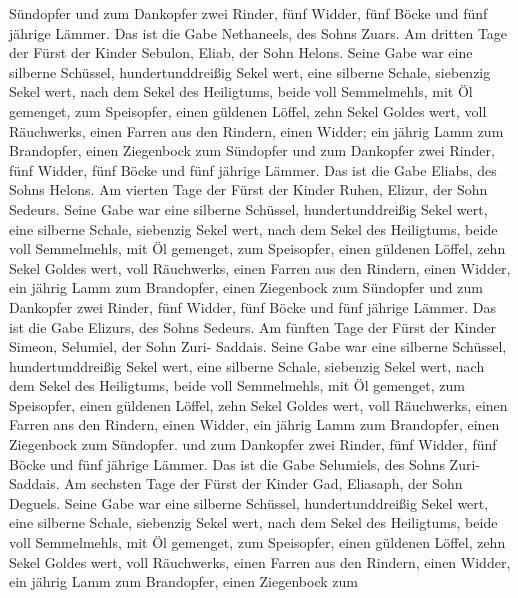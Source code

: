 Sündopfer  und zum Dankopfer zwei Rinder, fünf Widder, fünf
Böcke und fünf jährige Lämmer. Das ist die Gabe Nethaneels, des Sohns
Zuars.  Am dritten Tage der Fürst der Kinder Sebulon,
Eliab, der Sohn Helons.  Seine Gabe war eine silberne
Schüssel, hundertunddreißig Sekel wert, eine silberne Schale, siebenzig
Sekel wert, nach dem Sekel des Heiligtums, beide voll Semmelmehls, mit
Öl gemenget, zum Speisopfer,  einen güldenen Löffel, zehn
Sekel Goldes wert, voll Räuchwerks,  einen Farren aus den
Rindern, einen Widder; ein jährig Lamm zum Brandopfer, 
einen Ziegenbock zum Sündopfer  und zum Dankopfer zwei
Rinder, fünf Widder, fünf Böcke und fünf jährige Lämmer. Das ist die
Gabe Eliabs, des Sohns Helons.  Am vierten Tage der Fürst
der Kinder Ruhen, Elizur, der Sohn Sedeurs.  Seine Gabe war
eine silberne Schüssel, hundertunddreißig Sekel wert, eine silberne
Schale, siebenzig Sekel wert, nach dem Sekel des Heiligtums, beide voll
Semmelmehls, mit Öl gemenget, zum Speisopfer,  einen
güldenen Löffel, zehn Sekel Goldes wert, voll Räuchwerks, 
einen Farren aus den Rindern, einen Widder, ein jährig Lamm zum
Brandopfer,  einen Ziegenbock zum Sündopfer 
und zum Dankopfer zwei Rinder, fünf Widder, fünf Böcke und fünf jährige
Lämmer. Das ist die Gabe Elizurs, des Sohns Sedeurs.  Am
fünften Tage der Fürst der Kinder Simeon, Selumiel, der Sohn Zuri-
Saddais.  Seine Gabe war eine silberne Schüssel,
hundertunddreißig Sekel wert, eine silberne Schale, siebenzig Sekel
wert, nach dem Sekel des Heiligtums, beide voll Semmelmehls, mit Öl
gemenget, zum Speisopfer,  einen güldenen Löffel, zehn
Sekel Goldes wert, voll Räuchwerks,  einen Farren ans den
Rindern, einen Widder, ein jährig Lamm zum Brandopfer, 
einen Ziegenbock zum Sündopfer.  und zum Dankopfer zwei
Rinder, fünf Widder, fünf Böcke und fünf jährige Lämmer. Das ist die
Gabe Selumiels, des Sohns Zuri-Saddais.  Am sechsten Tage
der Fürst der Kinder Gad, Eliasaph, der Sohn Deguels. 
Seine Gabe war eine silberne Schüssel, hundertunddreißig Sekel wert,
eine silberne Schale, siebenzig Sekel wert, nach dem Sekel des
Heiligtums, beide voll Semmelmehls, mit Öl gemenget, zum Speisopfer,
 einen güldenen Löffel, zehn Sekel Goldes wert, voll
Räuchwerks,  einen Farren aus den Rindern, einen Widder,
ein jährig Lamm zum Brandopfer,  einen Ziegenbock zum
